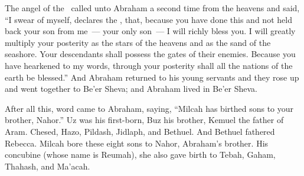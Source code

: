 \begin{inparaenum}
   The angel of the \lord\ called unto Abraham a second time from the heavens%
   and said, ``I swear of myself, declares the \lord, that, because you have done this and not held back your son from me\understood{}~--- your only son~---%
   I will richly bless you. I will greatly multiply your posterity as the stars of the heavens and as the sand of the seashore. Your descendants shall possess the gates of their enemies.%
   Because you have hearkened to my words, through your posterity shall all the nations of the earth be blessed.''%
   And Abraham returned to his young servants and they rose up and went together to Be'er Sheva; and Abraham lived in Be'er Sheva.%

   After all this, word came to Abraham, saying, ``Milcah has birthed sons to your brother, Nahor.''%
   Uz was his first-born, Buz his brother, Kemuel the father of Aram.%
   Chesed, Hazo, Pildash, Jidlaph, and Bethuel.%
   And Bethuel fathered Rebecca. Milcah bore these eight sons to Nahor, Abraham's brother.%
   His concubine (whose name is Reumah), she also gave birth to Tebah, Gaham, Thahash, and Ma'acah.%
\end{inparaenum}
